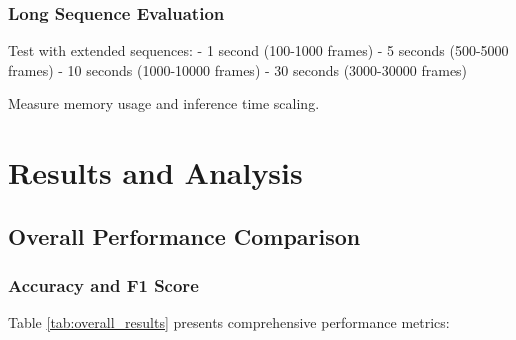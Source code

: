 \documentclass[10pt,journal,compsoc]{IEEEtran}
\begin{document}
\subsubsection{Long Sequence Evaluation}

Test with extended sequences:
- 1 second (100-1000 frames)
- 5 seconds (500-5000 frames)
- 10 seconds (1000-10000 frames)
- 30 seconds (3000-30000 frames)

Measure memory usage and inference time scaling.

\section{Results and Analysis}
\label{sec:results}

\subsection{Overall Performance Comparison}

\subsubsection{Accuracy and F1 Score}

Table \ref{tab:overall_results} presents comprehensive performance metrics:
\end{document}
